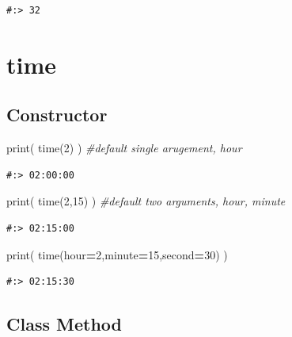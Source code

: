 \documentclass[
]{book}
\newenvironment{Shaded}{\begin{snugshade}}{\end{snugshade}}
\newcommand{\BuiltInTok}[1]{#1}
\newcommand{\CommentTok}[1]{\textcolor[rgb]{0.37,0.37,0.37}{\textit{#1}}}
\newcommand{\DecValTok}[1]{\textcolor[rgb]{0.06,0.06,0.06}{#1}}
\newcommand{\NormalTok}[1]{#1}
\newcommand{\OperatorTok}[1]{\textcolor[rgb]{0.43,0.43,0.43}{\textbf{#1}}}
\begin{document}
\begin{verbatim}
#:> 32
\end{verbatim}

\hypertarget{time}{%
\section{time}\label{time}}

\hypertarget{constructor-5}{%
\subsection{Constructor}\label{constructor-5}}

\begin{Shaded}
\begin{Highlighting}[]
\BuiltInTok{print}\NormalTok{( time(}\DecValTok{2}\NormalTok{) )    }\CommentTok{#default single arugement, hour}
\end{Highlighting}
\end{Shaded}

\begin{verbatim}
#:> 02:00:00
\end{verbatim}

\begin{Shaded}
\begin{Highlighting}[]
\BuiltInTok{print}\NormalTok{( time(}\DecValTok{2}\NormalTok{,}\DecValTok{15}\NormalTok{) ) }\CommentTok{#default two arguments, hour, minute}
\end{Highlighting}
\end{Shaded}

\begin{verbatim}
#:> 02:15:00
\end{verbatim}

\begin{Shaded}
\begin{Highlighting}[]
\BuiltInTok{print}\NormalTok{( time(hour}\OperatorTok{=}\DecValTok{2}\NormalTok{,minute}\OperatorTok{=}\DecValTok{15}\NormalTok{,second}\OperatorTok{=}\DecValTok{30}\NormalTok{) )}
\end{Highlighting}
\end{Shaded}

\begin{verbatim}
#:> 02:15:30
\end{verbatim}

\hypertarget{class-method-2}{%
\subsection{Class Method}\label{class-method-2}}
\end{document}
